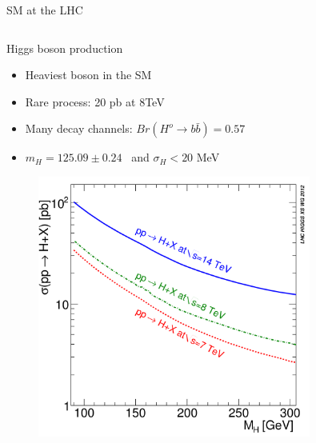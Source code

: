 \begin{frame}{SM at the LHC}
\begin{columns}
\begin{column}{.50\textwidth}
\begin{block}{Higgs boson production}
\begin{itemize}\tiny
\item Heaviest boson in the SM 
\item Rare process: 20 pb at 8TeV
\item Many decay channels: $Br(H^{o}\to b\bar{b})=0.57$
\item $m_{H}=125.09\pm 0.24$ \GeVcc~and $\sigma_{H}<20$ MeV
\end{itemize}
\end{block}

\vspace{-.2cm}
\begin{figure}[!Hhtbp]
  \begin{center}
    \includegraphics[width=0.8\textwidth]{../figs/totalXS_LM.png}
  \end{center}
\end{figure}

\end{column}
\end{columns}

\end{frame}

